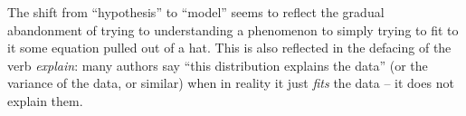 \documentclass[\ifafour a4paper,12pt,\else a5paper,10pt,\fi%
onecolumn,oneside,article,%
british%
]{memoir}
\makeatletter
\theoremstyle{remark}
\theoremstyle{innote}
\def\sum{\DOTSI\sumop\slimits@}
\newcommand*{\de}{\partialup}%
\newcommand*{\p}{\mathrm{P}}%
\renewcommand*{\|}[1][]{\nonscript\,#1\vert\nonscript\;\mathopen{}}
\newcommand*{\tsum}{\mathop{\textstyle\sum}\nolimits}
\makeatother
\begin{document}
The shift from \enquote{hypothesis} to \enquote{model} seems to reflect the
gradual abandonment of trying to understanding a phenomenon to simply
trying to fit to it some equation pulled out of a hat. This is also
reflected in the defacing of the verb \emph{explain}: many authors say
\enquote{this distribution explains the data} (or the variance of the data,
or similar) when in reality it just \emph{fits} the data -- it does not explain
them.







\end{document}
